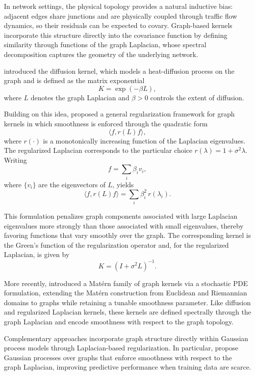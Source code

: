 \documentclass[11pt]{article}
\begin{document}
In network settings, the physical topology provides a natural inductive
bias: adjacent edges share junctions and are physically coupled through
traffic flow dynamics, so their residuals can be expected to covary.
Graph-based kernels incorporate this structure directly into the covariance
function by defining similarity through functions of the graph Laplacian,
whose spectral decomposition captures the geometry of the underlying
network.

\textcite{kondor2002diffusion} introduced the diffusion kernel, which
models a heat-diffusion process on the graph and is defined as the matrix
exponential
\[
    K = \exp(-\beta L),
\]
where $L$ denotes the graph Laplacian and $\beta > 0$ controls the extent
of diffusion.

Building on this idea, \textcite{smola2003kernels} proposed a general
regularization framework for graph kernels in which smoothness is enforced
through the quadratic form
\[
    \langle f, r(L)f \rangle,
\]
where $r(\cdot)$ is a monotonically increasing function of the Laplacian
eigenvalues. The regularized Laplacian corresponds to the particular choice
$r(\lambda)=1+\sigma^2\lambda$. Writing
\[
    f = \sum_i \beta_i v_i,
\]
where $\{v_i\}$ are the eigenvectors of $L$, yields
\[
    \langle f, r(L)f \rangle
    =
    \sum_i \beta_i^2\, r(\lambda_i).
\]


This formulation penalizes graph components associated with large Laplacian
eigenvalues more strongly than those associated with small eigenvalues,
thereby favoring functions that vary smoothly over the graph. The
corresponding kernel is the Green's function of the regularization operator
and, for the regularized Laplacian, is given by
\[
    K = (I+\sigma^2L)^{-1}.
\]





More recently, \textcite{borovitskiy2021matern} introduced a Matérn family
of graph kernels via a stochastic PDE formulation, extending the Matérn
construction from Euclidean and Riemannian domains to graphs while
retaining a tunable smoothness parameter. Like diffusion and regularized
Laplacian kernels, these kernels are defined spectrally through the graph
Laplacian and encode smoothness with respect to the graph topology.


Complementary approaches incorporate graph structure directly within Gaussian process models through Laplacian-based regularization. In particular, \textcite{venkitaraman2020gaussian} propose Gaussian processes over graphs that enforce smoothness with respect to the graph Laplacian, improving predictive performance when training data are scarce.
\end{document}
